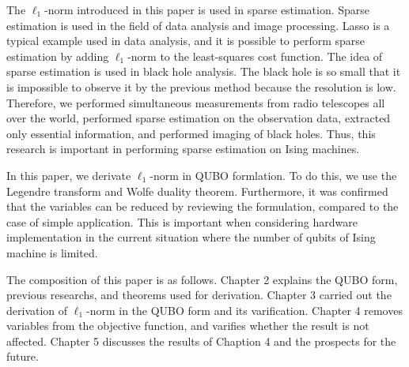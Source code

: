 \documentclass[fp,twocolumn]{jpsj3}
\begin{document}
The $\ell_{1}$-norm introduced in this paper is used in sparse estimation.
Sparse estimation is used in the field of data analysis and image processing.
Lasso is a typical example used in data analysis, and it is possible to perform sparse estimation by adding $\ell_{1}$-norm to the least-squares cost function.
The idea of sparse estimation is used in black hole analysis.
The black hole is so small that it is impossible to observe it by the previous method because the resolution is low.
Therefore, we performed simultaneous measurements from radio telescopes all over the world, performed sparse estimation on the observation data, extracted only essential information, and performed imaging of black holes.
Thus, this research is important in performing sparse estimation on Ising machines.

In this paper, we derivate $\ell_{1}$-norm in QUBO formlation.
To do this, we use the Legendre transform and Wolfe duality theorem.
Furthermore, it was confirmed that the variables can be reduced by reviewing the formulation, compared to the case of simple application.
This is important when considering hardware implementation in the current situation where the number of qubits of Ising machine is limited.

The composition of  this paper is as follows.
Chapter 2 explains the QUBO form, previous researchs, and theorems used for derivation.
Chapter 3 carried out the derivation of $\ell_{1}$-norm in the QUBO form and its varification.
Chapter 4 removes variables from the objective function, and varifies whether the result is not affected.
Chapter 5 discusses the results of Chaption 4 and the prospects for the future.
\end{document}
